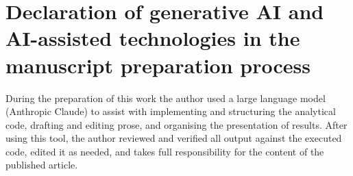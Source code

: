 \documentclass[11pt,a4paper]{article}
\begin{document}
\section*{Declaration of generative AI and AI-assisted technologies in the manuscript preparation process}
During the preparation of this work the author used a large language model (Anthropic Claude) to assist with implementing and structuring the analytical code, drafting and editing prose, and organising the presentation of results. After using this tool, the author reviewed and verified all output against the executed code, edited it as needed, and takes full responsibility for the content of the published article.

\end{document}
